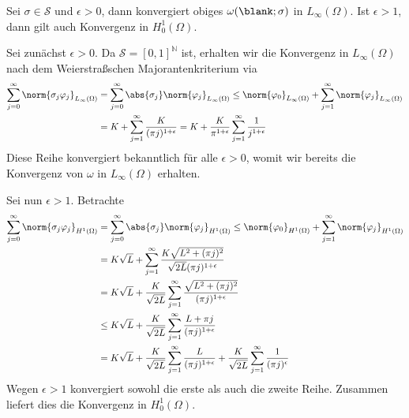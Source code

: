 \begin{Lemma}
    Sei $\sigma \in \mathcal S$ und $\epsilon > 0$, dann konvergiert obiges $\omega(\blank; \sigma)$ in $L_{\infty}(\Omega)$.
    Ist $\epsilon > 1$, dann gilt auch Konvergenz in $H^{1}_{0}(\Omega)$.

    \begin{Beweis}
        Sei zunächst $\epsilon > 0$.
        Da $\mathcal S = [0, 1]^{\mathbb{N}}$ ist, erhalten wir die Konvergenz in $L_{\infty}(\Omega)$ nach dem Weierstraßschen Majorantenkriterium via
        \begin{align}
            \sum_{j = 0}^{\infty} \norm{\sigma_{j} \varphi_{j}}_{L_{\infty}(\Omega)}
            &= \sum_{j = 0}^{\infty} \abs{\sigma_{j}} \norm{\varphi_{j}}_{L_{\infty}(\Omega)}
             \leq \norm{\varphi_{0}}_{L_{\infty}(\Omega)} + \sum_{j = 1}^{\infty}  \norm{\varphi_{j}}_{L_{\infty}(\Omega)}
            \\&= K + \sum_{j = 1}^{\infty} \frac{K}{(\pi j)^{1 + \epsilon}}
            = K + \frac{K}{\pi^{1 + \epsilon}} \sum_{j = 1}^{\infty} \frac{1}{j^{1+\epsilon}}
        \end{align}
        Diese Reihe konvergiert bekanntlich für alle $\epsilon > 0$, womit wir bereits die Konvergenz von $\omega$ in $L_{\infty}(\Omega)$ erhalten.

        Sei nun $\epsilon > 1$.
        Betrachte
        \begin{align}
            \sum_{j = 0}^{\infty} \norm{\sigma_{j} \varphi_{j}}_{H^{1}(\Omega)}
            &= \sum_{j = 0}^{\infty} \abs{\sigma_{j}} \norm{\varphi_{j}}_{H^{1}(\Omega)}
            \leq  \norm{\varphi_{0}}_{H^{1}(\Omega)} + \sum_{j = 1}^{\infty} \norm{\varphi_{j}}_{H^{1}(\Omega)}
            \\&= K \sqrt{L} + \sum_{j = 1}^{\infty} \frac{K \sqrt{L^{2} + (\pi j)^{2}}}{\sqrt{2L} (\pi j)^{1 + \epsilon}}
            \\&= K \sqrt{L} + \frac{K}{\sqrt{2L}} \sum_{j = 1}^{\infty} \frac{\sqrt{L^{2} + (\pi j)^{2}}}{(\pi j)^{1 + \epsilon}}
            \\&\leq K \sqrt{L} + \frac{K}{\sqrt{2L}} \sum_{j = 1}^{\infty} \frac{L + \pi j}{(\pi j)^{1 + \epsilon}}
            \\&= K \sqrt{L} + \frac{K}{\sqrt{2L}} \sum_{j = 1}^{\infty} \frac{L}{(\pi j)^{1 + \epsilon}} + \frac{K}{\sqrt{2L}} \sum_{j = 1}^{\infty} \frac{1}{(\pi j)^{\epsilon}}
        \end{align}
        Wegen $\epsilon > 1$ konvergiert sowohl die erste als auch die zweite Reihe.
        Zusammen liefert dies die Konvergenz in $H^{1}_{0}(\Omega)$.
    \end{Beweis}
\end{Lemma}

